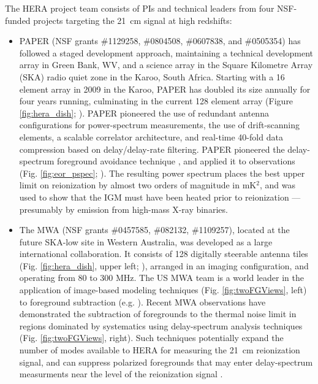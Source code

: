 \documentclass[preprint]{aastex}
\begin{document}
The HERA project team consists of PIs and technical leaders from four NSF-funded projects targeting the 21~cm signal
at high redshifts:
\begin{itemize}[noitemsep,nolistsep]

\item{PAPER} (NSF grants \#1129258, \#0804508, \#0607838, and \#0505354) has followed a
staged development approach, maintaining a technical development array in Green Bank, WV, and
a science array in the Square Kilometre Array (SKA) radio quiet zone in the Karoo, South Africa.  Starting with a 16 element
array in 2009 in the Karoo, PAPER has doubled its size annually for four years running, culminating in the current
128 element array (Figure \ref{fig:hera_dish}; \citealt{parsons_et_al2012a}).
PAPER pioneered the use of redundant antenna configurations
for power-spectrum measurements, the use of drift-scanning elements,
a scalable correlator architecture,
and real-time 40-fold data compression based on delay/delay-rate filtering.
PAPER pioneered the delay-spectrum foreground avoidance technique \citep{parsons_et_al2012b},
and applied it to observations (Fig. \ref{fig:eor_pspec}; \citealt{parsons_et_al2013}).
The resulting power spectrum places the best upper
limit on reionization by almost two orders of magnitude in mK$^2$, and was used to show that the IGM must have
been heated prior to reionization --- presumably by emission from high-mass X-ray binaries.

\item{The MWA} (NSF grants \#0457585, \#082132, \#1109257), 
located at the future SKA-low site
in Western Australia, was developed as a large international collaboration.  It consists
of 128 digitally steerable antenna tiles (Fig. \ref{fig:hera_dish}, upper left;
\citealt{tingay_et_al2013}), arranged in an imaging configuration, and operating from 80 to 300 MHz.
The US MWA team is a world leader in the application of image-based modeling techniques 
(Fig. \ref{fig:twoFGViews}, left) to
foreground subtraction (e.g. \citealt{hazelton_et_al2013,morales_et_al2006a}). %
Recent MWA observations have
demonstrated the subtraction of foregrounds to the thermal noise limit in regions dominated by systematics using
delay-spectrum analysis techniques (Fig. \ref{fig:twoFGViews}, right).
Such techniques potentially
expand the number of modes available to HERA for measuring the 21~cm reionization signal,
and can suppress polarized foregrounds that may enter delay-spectrum measurments near
the level of the reionization signal \citep{moore_et_al2013}. 


\end{itemize}
\end{document}
